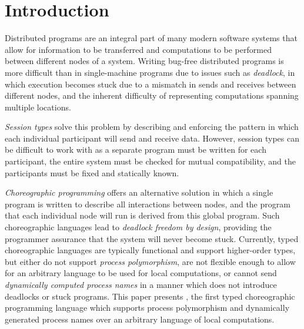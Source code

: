 \section{Introduction}
\label{sec:introduction}

Distributed programs are an integral part of many modern software systems that allow for information to be transferred and computations to be performed between different nodes of a system.
Writing bug-free distributed programs is more difficult than in single-machine programs due to issues such as \emph{deadlock}, in which execution becomes stuck due to a mismatch in sends and receives between different nodes, and the inherent difficulty of representing computations spanning multiple locations.

\emph{Session types} solve this problem by describing and enforcing the pattern in which each individual participant will send and receive data.
However, session types can be difficult to work with as a separate program must be written for each participant, the entire system must be checked for mutual compatibility, and the participants must be fixed and statically known.

\emph{Choreographic programming} offers an alternative solution in which a single program is written to describe all interactions between nodes, and the program that each individual node will run is derived from this global program.
Such choreographic languages lead to \emph{deadlock freedom by design}, providing the programmer assurance that the system will never become stuck.
Currently, typed choreographic languages are typically functional and support higher-order types, but either do not support \emph{process polymorphism}, are not flexible enough to allow for an arbitrary language to be used for local computations, or cannot send \emph{dynamically computed process names} in a manner which does not introduce deadlocks or stuck programs.
This paper presents \langname, the first typed choreographic programming language which supports process polymorphism and dynamically generated process names over an arbitrary language of local computations.

